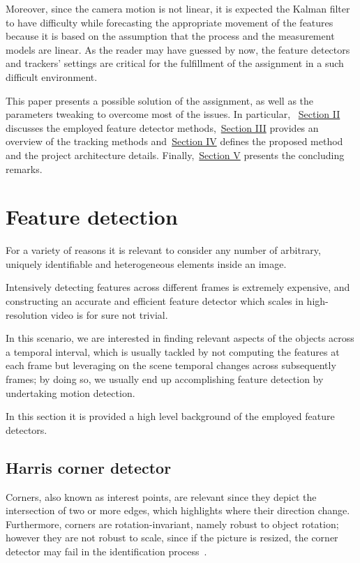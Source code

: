 \documentclass[journal]{IEEEtran}
\begin{document}
Moreover, since the camera motion is not linear, it is expected the Kalman filter to have difficulty while forecasting the appropriate movement of the features because it is based on the assumption that the process and the measurement models are linear. As the reader may have guessed by now, the feature detectors and trackers' settings are critical for the fulfillment of the assignment in a such difficult environment. 

This paper presents a possible solution of the assignment, as well as the parameters tweaking to overcome most of the issues. In particular, ~\hyperref[sec:featuredetection]{Section II} discusses the employed feature detector methods,~\hyperref[sec:featuretracking]{Section III} provides an overview of the tracking methods and~\hyperref[sec:projectstructure]{Section IV} defines the proposed method and the project architecture details. Finally,~\hyperref[sec:conclusion]{Section V} presents the concluding remarks.

\section{Feature detection}
\label{sec:featuredetection}
For a variety of reasons it is relevant to consider any number of arbitrary, uniquely identifiable and heterogeneous elements inside an image.

Intensively detecting features across different frames is extremely expensive, and constructing an accurate and efficient feature detector which scales in high-resolution video is for sure not trivial.

In this scenario, we are interested in finding relevant aspects of the objects across a temporal interval, which is usually tackled by not computing the features at each frame but leveraging on the scene temporal changes across subsequently frames; by doing so, we usually end up accomplishing feature detection by undertaking motion detection.

In this section it is provided a high level background of the employed feature detectors.

\subsection{Harris corner detector}
Corners, also known as interest points, are relevant since they depict the intersection of two or more edges, which highlights where their direction change. Furthermore, corners are rotation-invariant, namely robust to object rotation; however they are not robust to scale, since if the picture is resized, the corner detector may fail in the identification process~\cite{opencv_library}. 
\end{document}
